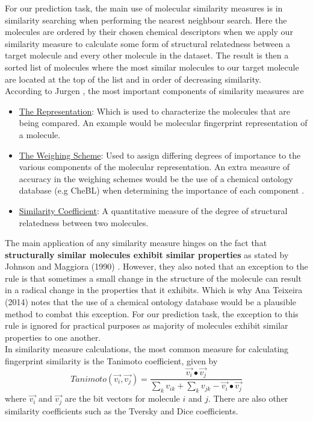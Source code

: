 \documentclass[a4paper,12pt]{report}
\begin{document}
			For our prediction task, the main use of molecular similarity measures is in similarity searching when performing the nearest neighbour search. Here the molecules are ordered by their chosen chemical descriptors when we apply our similarity measure to calculate some form of structural relatedness between a target molecule and every other molecule in the dataset. The result is then a sorted list of molecules where the most similar molecules to our target molecule are located at the top of the list and in order of decreasing similarity.\\
			According to Jurgen \cite{Jurgen2004}, the most important components of similarity measures are
				\begin{itemize}
					\item \underline{The Representation}: Which is used to characterize the molecules that are being compared. An example would be molecular fingerprint representation of a molecule.
					\item \underline{The Weighing Scheme}: Used to assign differing degrees of importance to the various components of the molecular representation. An extra measure of accuracy in the weighing schemes would be the use of a chemical ontology database (e.g CheBL) when determining the importance of each component \cite{AnaPhd2014}.
					\item \underline{Similarity Coefficient}: A quantitative measure of the degree of structural relatedness between two molecules.
				\end{itemize}
			The main application of any similarity measure hinges on the fact that \textbf{structurally similar molecules exhibit similar properties} as stated by Johnson and Maggiora (1990) \cite{JohnMaggiora1990}. However, they also noted that an exception to the rule is that sometimes a small change in the structure of the molecule can result in a radical change in the properties that it exhibits. Which is why Ana Teixeira (2014) \cite{AnaPhd2014} notes that the use of a chemical ontology database would be a plausible method to combat this exception. For our prediction task, the exception to this rule is ignored for practical purposes as majority of molecules exhibit similar properties to one another.\\
			In similarity measure calculations, the most common measure for calculating fingerprint similarity is the Tanimoto coefficient, given by 
				\begin{equation}
				Tanimoto(\vec{v_i}, \vec{v_j}) = 
				\frac{\vec{v_i}\bullet\vec{v_j}}
				{\sum_{k}v_{ik} + \sum_{k}v_{jk} - \vec{v_i}\bullet\vec{v_j}  } 
				\end{equation}
			where $\vec{v_i}$ and $\vec{v_j}$ are the bit vectors for molecule $i$ and $j$. There are also other similarity coefficients such as the Tversky and Dice coefficients.
	
\end{document}
